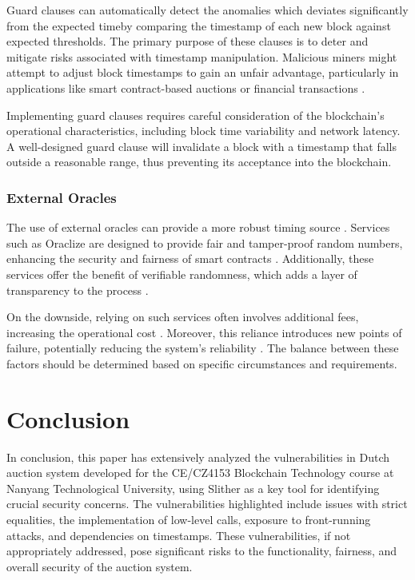 \documentclass[conference]{IEEEtran}
\begin{document}
Guard clauses can automatically detect the anomalies which deviates significantly from the expected timeby comparing the timestamp of each new block against expected thresholds.
The primary purpose of these clauses is to deter and mitigate risks associated with timestamp manipulation. Malicious miners might attempt to adjust block timestamps to gain an unfair advantage, particularly in applications like smart contract-based auctions or financial transactions \cite[Sec. 4.5, p. 78]{wood2014ethereum}.

Implementing guard clauses requires careful consideration of the blockchain's operational characteristics, including block time variability and network latency. A well-designed guard clause will invalidate a block with a timestamp that falls outside a reasonable range, thus preventing its acceptance into the blockchain.

\subsubsection{External Oracles}

The use of external oracles can provide a more robust timing source \cite{chainlink2020}. 
Services such as Oraclize are designed to provide fair and tamper-proof random numbers, enhancing the security and fairness of smart contracts \cite[Sec. X.X, p. Y]{clark2012security}. Additionally, these services offer the benefit of verifiable randomness, which adds a layer of transparency to the process \cite[Sec. A.A, p. B]{bonneau2015research}.

On the downside, relying on such services often involves additional fees, increasing the operational cost \cite[Chap. C.C, p. D]{narayanan2016bitcoin}. Moreover, this reliance introduces new points of failure, potentially reducing the system's reliability \cite[Sec. E.E, p. F]{eyal2014majority}. The balance between these factors should be determined based on specific circumstances and requirements. 


\section{Conclusion}
In conclusion, this paper has extensively analyzed the vulnerabilities in Dutch auction system developed for the CE/CZ4153 Blockchain Technology
course at Nanyang Technological University, using Slither as a key tool for identifying crucial security concerns. The vulnerabilities highlighted include issues with strict equalities, the implementation of low-level calls, exposure to front-running attacks, and dependencies on timestamps. These vulnerabilities, if not appropriately addressed, pose significant risks to the functionality, fairness, and overall security of the auction system.
\end{document}
